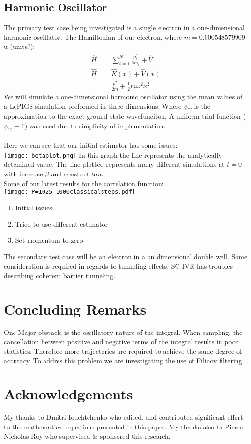 \documentclass[12pt,letterpaper,oneside,final,titlepage]{article}               %
\numberwithin{equation}{section} %
\newcommand{\psiT}{\psi_{\textrm{T}}}
\begin{document}
\subsection*{Harmonic Oscillator}
The primary test case being investigated is a single electron in a one-dimensional harmonic oscillator. 
The Hamiltonian of our electron, where $m = \num{0.000548579909}$u (units?): 
\begin{align}
    \hat{H} &= \sum_{i=1}^{N}\frac{\hat{p}_{i}^2}{2m_{i}} + \hat{V} \\
    \hat{H} &= \hat{K}(x) + \hat{V}(x) \\
            &= \frac{p^2}{2m} + \frac{1}{2} m \omega^{2} x^{2} 
\end{align}
We will simulate a one-dimensional harmonic oscillator using the mean values of a LePIGS simulation preformed in three dimensions. 
Where $\psiT$ is the approximation to the exact ground state wavefunciton. 
A uniform trial function ($\psiT = 1$) was used due to simplicity of implementation. \\ \\
Here we can see that our initial estimator has some issues:\\
\texttt{[image: betaplot.png]}
In this graph the line represents the analytically detemined value.
The line plotted represents many different simulations at $t=0$ with increase $\beta$ and constant $tau$.\\
Some of our latest results for the correlation function:\\
\texttt{[image: P=1025\_1000classicalsteps.pdf]}
\begin{enumerate}
    \item Initial issues
    \item Tried to use different estimator
    \item Set momentum to zero
\end{enumerate}

The secondary test case will be an electron in a on dimensional double well. 
Some consideration is required in regards to tunneling effects. SC-IVR has troubles describing coherent barrier tunneling.

\section{Concluding Remarks}
One Major obstacle is the oscillatory nature of the integral. When sampling, the cancellation between positive and negative terms of the integral results in poor statistics. Therefore more trajectories are required to achieve the same degree of accuracy. To addres this problem we are investigating the use of Filinov filtering.

\newpage

\section{Acknowledgements}
My thanks to Dmitri Iouchtchenko who edited, and contributed significant effort to the mathematical equations presented in this paper. 
My thanks also to Pierre-Nicholas Roy who supervised \& sponsored this research.

\renewcommand*{\bibfont}{\scriptsize}
\printbibliography
\end{document}

